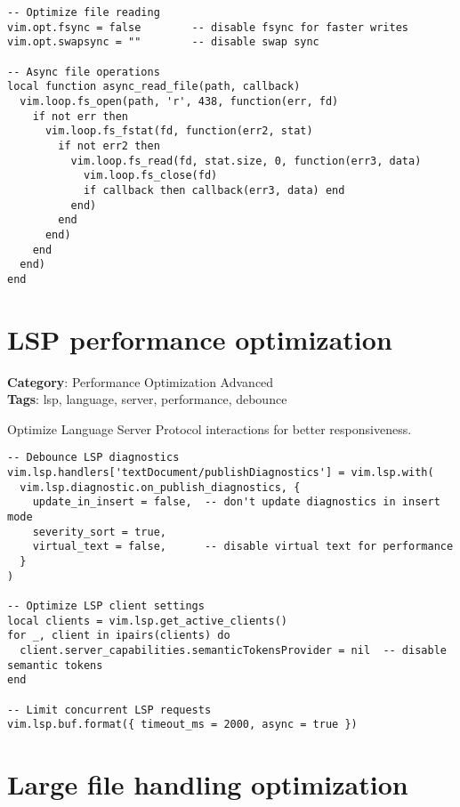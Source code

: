 {{{{{{{{{{\begin{Exa*}{}
\begin{Verbatim}[fontsize=\footnotesize, breaklines, breakanywhere]
-- Optimize file reading
vim.opt.fsync = false        -- disable fsync for faster writes
vim.opt.swapsync = ""        -- disable swap sync

-- Async file operations
local function async_read_file(path, callback)
  vim.loop.fs_open(path, 'r', 438, function(err, fd)
    if not err then
      vim.loop.fs_fstat(fd, function(err2, stat)
        if not err2 then
          vim.loop.fs_read(fd, stat.size, 0, function(err3, data)
            vim.loop.fs_close(fd)
            if callback then callback(err3, data) end
          end)
        end
      end)
    end
  end)
end
\end{Verbatim}
\end{Exa*}

\section{LSP performance optimization}

\textbf{Category}: Performance Optimization Advanced\\ \textbf{Tags}: lsp, language, server, performance, debounce
\vspace{0.5cm}

Optimize Language Server Protocol interactions for better responsiveness.

\begin{Exa*}{}
\begin{Verbatim}[fontsize=\footnotesize, breaklines, breakanywhere]
-- Debounce LSP diagnostics
vim.lsp.handlers['textDocument/publishDiagnostics'] = vim.lsp.with(
  vim.lsp.diagnostic.on_publish_diagnostics, {
    update_in_insert = false,  -- don't update diagnostics in insert mode
    severity_sort = true,
    virtual_text = false,      -- disable virtual text for performance
  }
)

-- Optimize LSP client settings
local clients = vim.lsp.get_active_clients()
for _, client in ipairs(clients) do
  client.server_capabilities.semanticTokensProvider = nil  -- disable semantic tokens
end

-- Limit concurrent LSP requests
vim.lsp.buf.format({ timeout_ms = 2000, async = true })
\end{Verbatim}
\end{Exa*}

\section{Large file handling optimization}

}}}}}}}}}}
